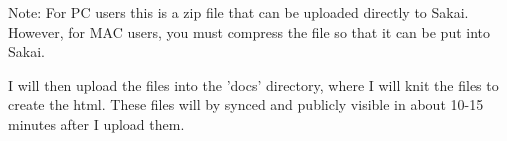\documentclass{article}\usepackage[]{graphicx}\usepackage[]{color}
\begin{document}
Note: For PC users this is a zip file that can be uploaded directly to Sakai. However, for MAC users, you must compress the file so that it can be put into Sakai. 

I will then upload the files into the 'docs' directory, where I will knit the files to create the html. These files will by synced and publicly visible in about 10-15 minutes after I upload them. 
\end{document}
